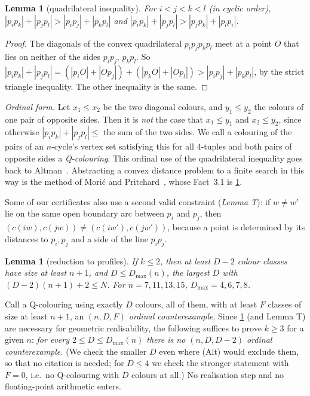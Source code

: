 \documentclass[11pt]{amsart}
\newtheorem{lemma}[theorem]{Lemma}
\theoremstyle{definition}
\theoremstyle{remark}
\begin{document}
\begin{lemma}[quadrilateral inequality]\label{lem:Q}
For $i<j<k<l$ (in cyclic order), $|p_ip_k|+|p_jp_l|>|p_ip_j|+|p_kp_l|$ and $|p_ip_k|+|p_jp_l|>|p_jp_k|+|p_lp_i|$.
\end{lemma}
\begin{proof}
The diagonals of the convex quadrilateral $p_ip_jp_kp_l$ meet at a point $O$ that lies on neither of the sides $p_ip_j$, $p_kp_l$. So $|p_ip_k|+|p_jp_l|=(|p_iO|+|Op_j|)+(|p_kO|+|Op_l|)>|p_ip_j|+|p_kp_l|$, by the strict triangle inequality. The other inequality is the same.
\end{proof}

\emph{Ordinal form.} Let $x_1\le x_2$ be the two diagonal colours, and $y_1\le y_2$ the colours of one pair of opposite sides. Then it is \emph{not} the case that $x_1\le y_1$ and $x_2\le y_2$, since otherwise $|p_ip_k|+|p_jp_l|\le$ the sum of the two sides. We call a colouring of the pairs of an $n$-cycle's vertex set satisfying this for all $4$-tuples and both pairs of opposite sides a \emph{Q-colouring}. This ordinal use of the quadrilateral inequality goes back to Altman~\cite{Alt63}. Abstracting a convex distance problem to a finite search in this way is the method of Mori\'c and Pritchard~\cite{MP11}, whose Fact~3.1 is \cref{lem:Q}.

Some of our certificates also use a second valid constraint (\emph{Lemma T}): if $w\ne w'$ lie on the same open boundary arc between $p_i$ and $p_j$, then $(c(iw),c(jw))\ne(c(iw'),c(jw'))$, because a point is determined by its distances to $p_i,p_j$ and a side of the line $p_ip_j$.

\begin{lemma}[reduction to profiles]\label{lem:R}
If $k\le2$, then at least $D-2$ colour classes have size at least $n+1$, and $D\le D_{\max}(n)$, the largest $D$ with $(D-2)(n+1)+2\le N$. For $n=7,11,13,15$, $D_{\max}=4,6,7,8$.
\end{lemma}

Call a Q-colouring using exactly $D$ colours, all of them, with at least $F$ classes of size at least $n+1$, an \emph{$(n,D,F)$ ordinal counterexample}. Since \cref{lem:Q} (and Lemma T) are necessary for geometric realisability, the following suffices to prove $k\ge3$ for a given $n$: \emph{for every $2\le D\le D_{\max}(n)$ there is no $(n,D,D-2)$ ordinal counterexample.} (We check the smaller $D$ even where (Alt) would exclude them, so that no citation is needed; for $D\le4$ we check the stronger statement with $F=0$, i.e.\ no Q-colouring with $D$ colours at all.) No realisation step and no floating-point arithmetic enters.
\end{document}
